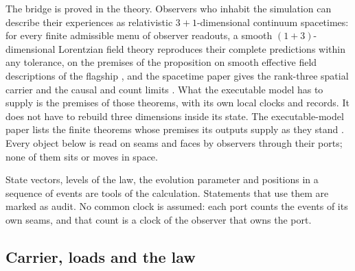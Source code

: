 The bridge is proved in the theory. Observers who inhabit the simulation can describe
their experiences as relativistic $3+1$-dimensional continuum spacetimes: for every
finite admissible menu of observer readouts, a smooth $(1+3)$-dimensional Lorentzian
field theory reproduces their complete predictions within any tolerance, on the premises
of the proposition on smooth
effective field descriptions of the flagship \cite{flagship}, and the spacetime paper
gives the rank-three spatial carrier and the causal and count limits \cite{ophEinstein}.
What the executable model has to supply is the premises of those theorems, with its own
local clocks and records. It does not have to rebuild three dimensions inside its state.
The executable-model paper lists the finite theorems whose premises its outputs supply as
they stand \cite{ophmodel}.
Every object below is read on seams and faces by observers through their ports; none of
them sits or moves in space.

State vectors, levels of the law, the evolution parameter and positions in a sequence of
events are tools of the calculation. Statements that use them are marked as audit. No
common clock is assumed: each port counts the events of its own seams, and that count is
a clock of the observer that owns the port.

\subsection{Carrier, loads and the law}

